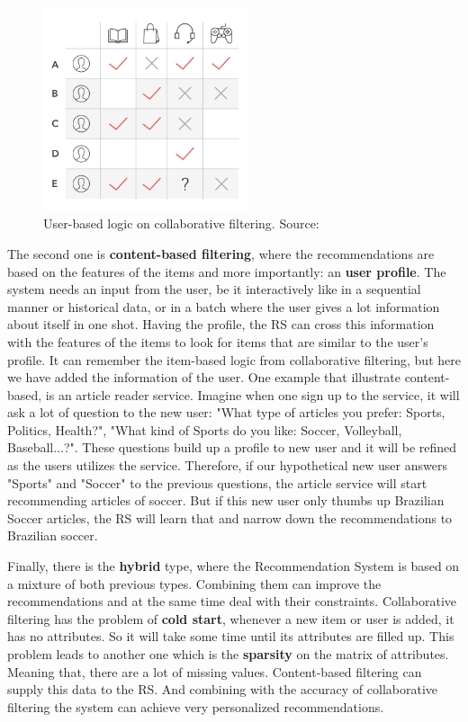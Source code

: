 \begin{figure}[h]
   \centering
   \includegraphics[width=6cm]{fig/ch2-colab-filt-user-user.jpg}
   \caption{User-based logic on collaborative filtering. Source: \cite{delawareai}}
   \label{fig:colab-filt-user-user}
\end{figure}

The second one is \textbf{content-based filtering}, where the recommendations are based on the features of the items and more importantly: an \textbf{user profile}. The system needs an input from the user, be it interactively like in a sequential manner or historical data, or in a batch where the user gives a lot information about itself in one shot. Having the profile, the RS can cross this information with the features of the items to look for items that are similar to the user's profile. It can remember the item-based logic from collaborative filtering, but here we have added the information of the user. One example that illustrate content-based, is an article reader service. Imagine when one sign up to the service, it will ask a lot of question to the new user: "What type of articles you prefer: Sports, Politics, Health?", "What kind of Sports do you like: Soccer, Volleyball, Baseball...?". These questions build up a profile to new user and it will be refined as the users utilizes the service. Therefore, if our hypothetical new user answers "Sports" and "Soccer" to the previous questions, the article service will start recommending articles of soccer. But if this new user only thumbs up Brazilian Soccer articles, the RS will learn that and narrow down the recommendations to Brazilian soccer.

Finally, there is the \textbf{hybrid} type, where the Recommendation System is based on a mixture of both previous types. Combining them can improve the recommendations and at the same time deal with their constraints. Collaborative filtering has the problem of \textbf{cold start}, whenever a new item or user is added, it has no attributes. So it will take some time until its attributes are filled up. This problem leads to another one which is the \textbf{sparsity} on the matrix of attributes. Meaning that, there are a lot of missing values. Content-based filtering can supply this data to the RS. And combining with the accuracy of collaborative filtering the system can achieve very personalized recommendations.


